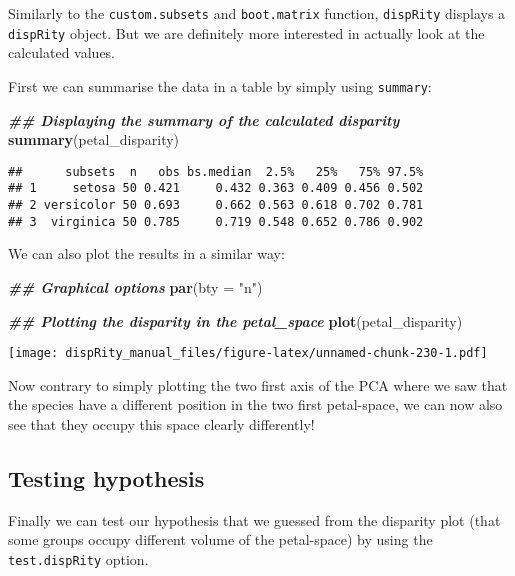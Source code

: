 \documentclass[
]{book}
\newenvironment{Shaded}{\begin{snugshade}}{\end{snugshade}}
\newcommand{\AttributeTok}[1]{\textcolor[rgb]{0.13,0.29,0.53}{#1}}
\newcommand{\DocumentationTok}[1]{\textcolor[rgb]{0.56,0.35,0.01}{\textbf{\textit{#1}}}}
\newcommand{\FunctionTok}[1]{\textcolor[rgb]{0.13,0.29,0.53}{\textbf{#1}}}
\newcommand{\NormalTok}[1]{#1}
\newcommand{\StringTok}[1]{\textcolor[rgb]{0.31,0.60,0.02}{#1}}
\begin{document}
Similarly to the \texttt{custom.subsets} and \texttt{boot.matrix} function, \texttt{dispRity} displays a \texttt{dispRity} object.
But we are definitely more interested in actually look at the calculated values.

First we can summarise the data in a table by simply using \texttt{summary}:

\begin{Shaded}
\begin{Highlighting}[]
\DocumentationTok{\#\# Displaying the summary of the calculated disparity}
\FunctionTok{summary}\NormalTok{(petal\_disparity)}
\end{Highlighting}
\end{Shaded}

\begin{verbatim}
##      subsets  n   obs bs.median  2.5%   25%   75% 97.5%
## 1     setosa 50 0.421     0.432 0.363 0.409 0.456 0.502
## 2 versicolor 50 0.693     0.662 0.563 0.618 0.702 0.781
## 3  virginica 50 0.785     0.719 0.548 0.652 0.786 0.902
\end{verbatim}

We can also plot the results in a similar way:

\begin{Shaded}
\begin{Highlighting}[]
\DocumentationTok{\#\# Graphical options}
\FunctionTok{par}\NormalTok{(}\AttributeTok{bty =} \StringTok{"n"}\NormalTok{)}

\DocumentationTok{\#\# Plotting the disparity in the petal\_space}
\FunctionTok{plot}\NormalTok{(petal\_disparity)}
\end{Highlighting}
\end{Shaded}

\texttt{[image: dispRity\_manual\_files/figure-latex/unnamed-chunk-230-1.pdf]}

Now contrary to simply plotting the two first axis of the PCA where we saw that the species have a different position in the two first petal-space, we can now also see that they occupy this space clearly differently!

\hypertarget{testing-hypothesis}{%
\subsection{Testing hypothesis}\label{testing-hypothesis}}

Finally we can test our hypothesis that we guessed from the disparity plot (that some groups occupy different volume of the petal-space) by using the \texttt{test.dispRity} option.
\end{document}
